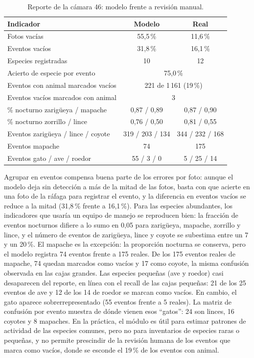 \begin{table}[h]
  \centering
  \caption{Reporte de la cámara 46: modelo frente a revisión manual.}
  \label{tab:monitoreo}
  \begin{tabular}{lcc}
    \toprule
    Indicador & Modelo & Real \\
    \midrule
    Fotos vacías                         & 55,5\,\% & 11,6\,\% \\
    Eventos vacíos                       & 31,8\,\% & 16,1\,\% \\
    Especies registradas                 & 10 & 12 \\
    Acierto de especie por evento        & \multicolumn{2}{c}{75,0\,\%} \\
    Eventos con animal marcados vacíos   & \multicolumn{2}{c}{221 de 1\,161 (19\,\%)} \\
    Eventos vacíos marcados con animal   & \multicolumn{2}{c}{3} \\
    \midrule
    \% nocturno zarigüeya / mapache      & 0,87 / 0,89 & 0,87 / 0,90 \\
    \% nocturno zorrillo / lince         & 0,76 / 0,50 & 0,81 / 0,55 \\
    Eventos zarigüeya / lince / coyote   & 319 / 203 / 134 & 344 / 232 / 168 \\
    Eventos mapache                      & 74 & 175 \\
    Eventos gato / ave / roedor          & 55 / 3 / 0 & 5 / 25 / 14 \\
    \bottomrule
  \end{tabular}
\end{table}

Agrupar en eventos compensa buena parte de los errores por foto: aunque el
modelo deja sin detección a más de la mitad de las fotos, basta con que acierte
en una foto de la ráfaga para registrar el evento, y la diferencia en eventos
vacíos se reduce a la mitad (31,8\,\% frente a 16,1\,\%). Para las especies
abundantes, los indicadores que usaría un equipo de manejo se reproducen bien:
la fracción de eventos nocturnos difiere a lo sumo en 0,05 para zarigüeya,
mapache, zorrillo y lince, y el número de eventos de zarigüeya, lince y coyote
se subestima entre un 7 y un 20\,\%. El mapache es la excepción: la
proporción nocturna se conserva, pero el modelo registra 74 eventos frente a
175 reales. De los 175 eventos reales de mapache, 74 quedan marcados como vacíos
y 17 como coyote, la misma confusión observada en las cajas grandes. Las
especies pequeñas (ave y roedor) casi desaparecen del reporte, en línea con el
recall de las cajas pequeñas: 21 de los 25 eventos de ave y 12 de los 14 de
roedor se marcan como vacíos. En cambio, el gato aparece sobrerrepresentado (55
eventos frente a 5 reales). La matriz de confusión por evento muestra de dónde
vienen esos ``gatos'': 24 son linces, 16 coyotes y 8 mapaches. En la práctica, el módulo es útil para estimar
patrones de actividad de las especies comunes, pero no para inventarios de
especies raras o pequeñas, y no permite prescindir de la revisión humana de
los eventos que marca como vacíos, donde se esconde el 19\,\% de los eventos con
animal.
